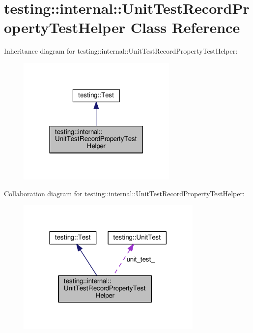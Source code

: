 \hypertarget{classtesting_1_1internal_1_1UnitTestRecordPropertyTestHelper}{}\section{testing\+:\+:internal\+:\+:Unit\+Test\+Record\+Property\+Test\+Helper Class Reference}
\label{classtesting_1_1internal_1_1UnitTestRecordPropertyTestHelper}


Inheritance diagram for testing\+:\+:internal\+:\+:Unit\+Test\+Record\+Property\+Test\+Helper\+:
\nopagebreak
\begin{figure}[H]
\begin{center}
\leavevmode
\includegraphics[width=222pt]{classtesting_1_1internal_1_1UnitTestRecordPropertyTestHelper__inherit__graph}
\end{center}
\end{figure}


Collaboration diagram for testing\+:\+:internal\+:\+:Unit\+Test\+Record\+Property\+Test\+Helper\+:
\nopagebreak
\begin{figure}[H]
\begin{center}
\leavevmode
\includegraphics[width=258pt]{classtesting_1_1internal_1_1UnitTestRecordPropertyTestHelper__coll__graph}
\end{center}
\end{figure}

